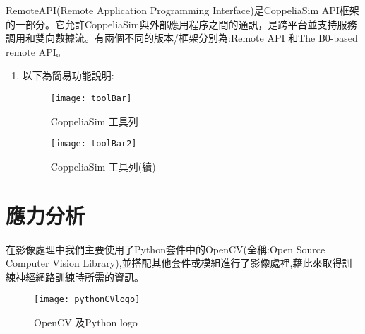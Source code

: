  RemoteAPI(Remote Application Programming Interface)是CoppeliaSim API框架的一部分。它允許CoppeliaSim與外部應用程序之間的通訊，是跨平台並支持服務調用和雙向數據流。有兩個不同的版本/框架分別為:Remote API 和The B0-based remote API。\\
\begin{enumerate}
\item 以下為簡易功能說明:
\begin{figure}[hbt!]
\center
\texttt{[image: toolBar]}
\caption{\Large CoppeliaSim 工具列}
\texttt{[image: toolBar2]}
\caption{\Large CoppeliaSim 工具列(續)}
\end{figure}
\begin{table}[hbt!]
\center
\large
{}
\caption{\Large 功能說明}
\end{table}
\newpage
\end{enumerate}
\section{應力分析}

\qquad 在影像處理中我們主要使用了Python套件中的OpenCV(全稱:Open Source Computer Vision Library),並搭配其他套件或模組進行了影像處裡,藉此來取得訓練神經網路訓練時所需的資訊。\\
\begin{figure}[hbt!]
\center
\texttt{[image: pythonCVlogo]}
\caption{\Large OpenCV 及Python logo}
\end{figure}

